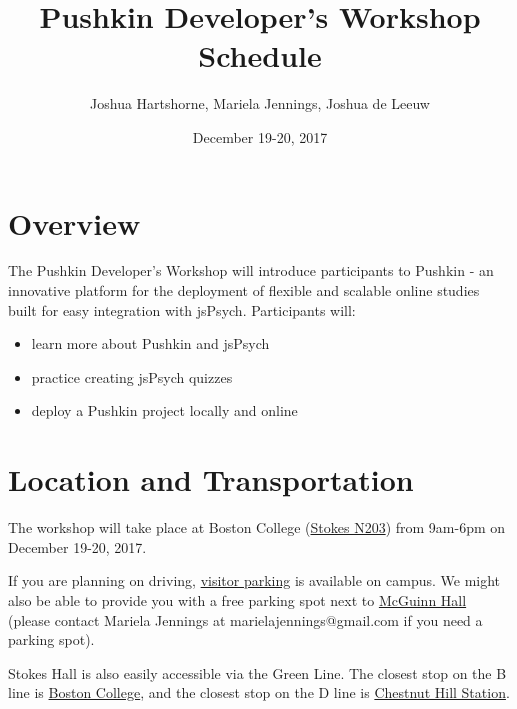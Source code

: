 \documentclass[letterpaper,11pt]{article}
\begin{document}
\title{Pushkin Developer's Workshop Schedule}
\author{Joshua Hartshorne, Mariela Jennings, Joshua de Leeuw}
\date{December 19-20, 2017}

\maketitle

\section{Overview}
\noindent The Pushkin Developer's Workshop will introduce participants to Pushkin - an innovative platform for the deployment of flexible and scalable online studies built for easy integration with jsPsych. Participants will:
\begin{itemize}
\item learn more about Pushkin and jsPsych
\item practice creating jsPsych quizzes 
\item deploy a Pushkin project locally and online
\end{itemize}


\section{Location and Transportation}
\noindent The workshop will take place at Boston College (\href{https://www.google.com/maps/place/Stokes+Hall/@42.3341155,-71.1734724,17z/data=!3m1!4b1!4m5!3m4!1s0x89e3786033c435af:0x2e90188df7eeb92b!8m2!3d42.3341155!4d-71.1712837}{Stokes N203}) from 9am-6pm on December 19-20, 2017. 

\vspace{5mm}

\noindent If you are planning on driving, \href{http://www.bc.edu/offices/transportation/visitor.html} {visitor parking} is available on campus. We might also be able to provide you with a free parking spot next to \href{https://www.google.com/maps/place/McGuinn+Hall/@42.3337275,-71.1719167,17z/data=!3m1!4b1!4m5!3m4!1s0x89e378601bd55acf:0xaf28b60b9ddceb4f!8m2!3d42.3337275!4d-71.169728} {McGuinn Hall} (please contact Mariela Jennings at marielajennings@gmail.com if you need a parking spot).

\vspace{5mm}

\noindent Stokes Hall is also easily accessible via the Green Line. The closest stop on the B line is \href{https://www.google.com/maps/place/Boston+College/@42.3401305,-71.1692767,17z/data=!3m1!4b1!4m5!3m4!1s0x89e3785d0bd5d78f:0x8951e9c865115823!8m2!3d42.3401305!4d-71.167088}{Boston College}, and the closest stop on the D line is \href{https://www.google.com/maps/place/Chestnut+Hill+Station/@42.3268724,-71.1666582,17z/data=!3m1!4b1!4m5!3m4!1s0x89e378f39f48ee79:0xabec7d4b3cfd8a9c!8m2!3d42.3268724!4d-71.1644695}{Chestnut Hill Station}.
\end{document}
